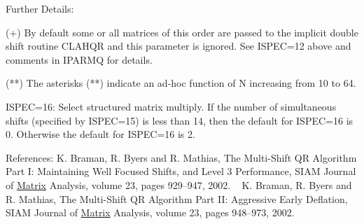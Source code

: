 \begin{DoxyParagraph}{Further Details\+: }
\begin{DoxyVerb}
                  (+)  By default some or all matrices of this order
                       are passed to the implicit double shift routine
                       CLAHQR and this parameter is ignored.  See
                       ISPEC=12 above and comments in IPARMQ for
                       details.

                 (**)  The asterisks (**) indicate an ad-hoc
                       function of N increasing from 10 to 64.

            ISPEC=16: Select structured matrix multiply.
                      If the number of simultaneous shifts (specified
                      by ISPEC=15) is less than 14, then the default
                      for ISPEC=16 is 0.  Otherwise the default for
                      ISPEC=16 is 2.\end{DoxyVerb}
 
\end{DoxyParagraph}
\begin{DoxyParagraph}{References\+: }
K. Braman, R. Byers and R. Mathias, The Multi-\/\+Shift Q\+R Algorithm Part I\+: Maintaining Well Focused Shifts, and Level 3 Performance, S\+I\+A\+M Journal of \hyperlink{classMatrix}{Matrix} Analysis, volume 23, pages 929--947, 2002. ~\newline
 K. Braman, R. Byers and R. Mathias, The Multi-\/\+Shift Q\+R Algorithm Part I\+I\+: Aggressive Early Deflation, S\+I\+A\+M Journal of \hyperlink{classMatrix}{Matrix} Analysis, volume 23, pages 948--973, 2002. 
\end{DoxyParagraph}
